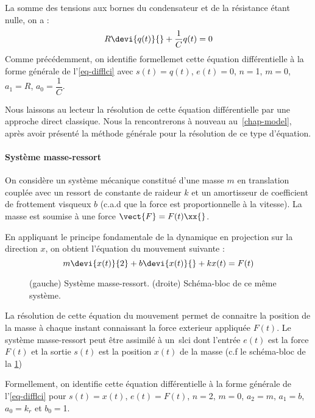 La somme des tensions aux bornes du condensateur et de la résistance 
étant nulle, on a :
\begin{align*}
    R\devi{q(t)}{}+\dfrac{1}{C}q(t)=0 
\end{align*}
Comme précédemment, on identifie formellemet cette équation différentielle 
à la forme générale de l'\cref{eq-difflci} avec $s(t)=q(t)$, $e(t)=0$, 
$n=$1, $m=0$, $a_1=R$, $a_0=\dfrac{1}{C}$.

Nous laissons au lecteur la résolution de cette équation différentielle 
par une approche direct classique.
Nous la rencontrerons à nouveau au~\cref{chap-model}, après avoir 
présenté la méthode générale pour la résolution de ce type d'équation.

\paragraph{Système masse-ressort}
On considère un système mécanique constitué d'une masse $m$ en translation 
couplée avec un ressort de constante
de raideur $k$ et un amortisseur de coefficient de frottement 
visqueux $b$ (c.a.d que la force est 
proportionnelle à la vitesse). 
La masse est soumise à une force $\vect{F}=F(t)\xx{}$.

En appliquant le principe fondamentale de la dynamique en projection 
sur la direction $x$, on obtient l'équation du mouvement suivante :
$$
m\devi{x(t)}{2}+b\devi{x(t)}{}+kx(t)=F(t)
$$
\begin{figure}[!h]
    \centering
    
    \caption{(gauche) Système masse-ressort. (droite) Schéma-bloc de ce même 
    système.
    \label{fig-masse-ressort}}
\end{figure}

La résolution de cette équation du mouvement permet de connaitre la position 
de la masse à chaque instant connaissant la force exterieur 
appliquée $F(t)$. Le système masse-ressort peut être assimilé à un~\gls{slci} 
dont l'entrée $e(t)$ est la force $F(t)$ et la sortie $s(t)$ est la 
position $x(t)$ de la masse (c.f le schéma-bloc de la \cref{fig-masse-ressort})

Formellement, on identifie cette équation différentielle à la forme générale 
de l'\cref{eq-difflci} pour $s(t)=x(t)$, $e(t)=F(t)$, 
$n=$2, $m=0$, $a_2=m$, $a_1=b$, $a_0=k_r$ et $b_0=$1.


